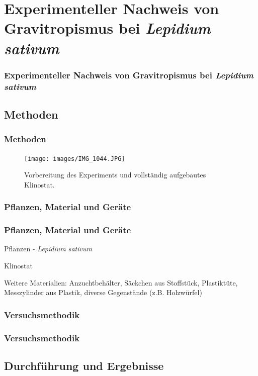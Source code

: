 \documentclass[aspectratio=169]{beamer}
\begin{document}
	\section{Experimenteller Nachweis von Gravitropismus bei \protect\emph{Lepidium sativum}}
	
	\begin{frame}
		\frametitle{Experimenteller Nachweis von Gravitropismus bei \protect\emph{Lepidium sativum}}
	\end{frame}	
	
	\subsection{Methoden}
	
	\begin{frame}
		\frametitle{Methoden}
		\begin{figure}[H]
			\centering 
			\texttt{[image: images/IMG\_1044.JPG]}
			\caption{Vorbereitung des Experiments und vollständig aufgebautes Klinostat.\label{Klinostat2}}
		\end{figure}
		
	\end{frame}
	
	\subsubsection{Pflanzen, Material und Geräte}

	\begin{frame}
		\frametitle{Pflanzen, Material und Geräte}
		Pflanzen - \protect\emph{Lepidium sativum}
		
		Klinostat
		
		Weitere Materialien: Anzuchtbehälter, Säckchen aus Stoffstück, Plastiktüte, Messzylinder aus Plastik, diverse Gegenstände (z.B. Holzwürfel) 
	\end{frame}
	
	\subsubsection{Versuchsmethodik}
	
	\begin{frame}
		\frametitle{Versuchsmethodik}
	\end{frame}
	
	\subsection{Durchführung und Ergebnisse}
	
\end{document}
